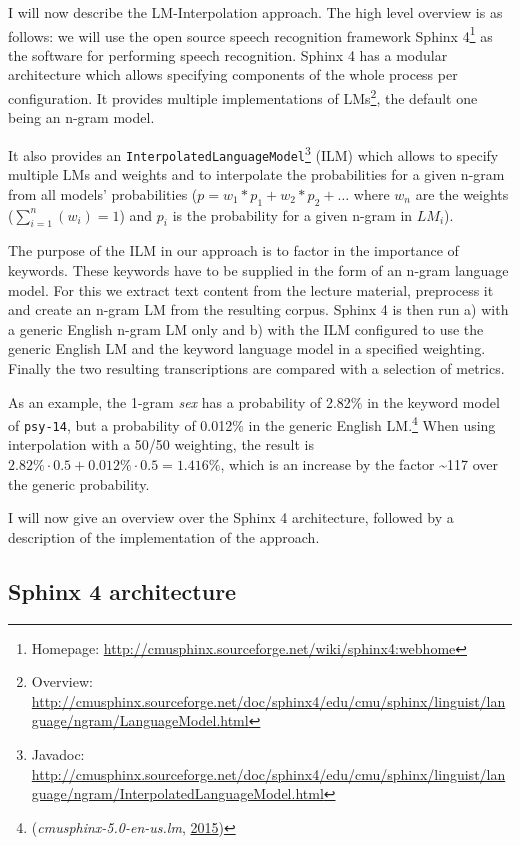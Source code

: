 \documentclass[]{article}
\begin{document}
I will now describe the LM-Interpolation approach. The high level
overview is as follows: we will use the open source speech recognition
framework Sphinx 4\footnote{Homepage:
  \url{http://cmusphinx.sourceforge.net/wiki/sphinx4:webhome}} as the
software for performing speech recognition. Sphinx 4 has a modular
architecture which allows specifying components of the whole process per
configuration. It provides multiple implementations of LMs\footnote{Overview:
  \url{http://cmusphinx.sourceforge.net/doc/sphinx4/edu/cmu/sphinx/linguist/language/ngram/LanguageModel.html}},
the default one being an n-gram model.

It also provides an \texttt{InterpolatedLanguageModel}\footnote{Javadoc:
  \url{http://cmusphinx.sourceforge.net/doc/sphinx4/edu/cmu/sphinx/linguist/language/ngram/InterpolatedLanguageModel.html}}
(ILM) which allows to specify multiple LMs and weights and to
interpolate the probabilities for a given n-gram from all models'
probabilities (\(p = w_1*p_1 + w_2*p_2 + \ldots\) where \(w_n\) are the
weights (\(\sum_{i=1}^n(w_i) = 1\)) and \(p_i\) is the probability for a
given n-gram in \(LM_i\)).

The purpose of the ILM in our approach is to factor in the importance of
keywords. These keywords have to be supplied in the form of an n-gram
language model. For this we extract text content from the lecture
material, preprocess it and create an n-gram LM from the resulting
corpus. Sphinx 4 is then run a) with a generic English n-gram LM only
and b) with the ILM configured to use the generic English LM and the
keyword language model in a specified weighting. Finally the two
resulting transcriptions are compared with a selection of metrics.

As an example, the 1-gram \emph{sex} has a probability of 2.82\% in the
keyword model of \texttt{psy-14}, but a probability of 0.012\% in the
generic English LM.\footnote{(\emph{cmusphinx-5.0-en-us.lm},
  \hyperref[ref-cmuLm]{2015})} When using interpolation with a 50/50
weighting, the result is
\(2.82\% \cdot 0.5 + 0.012\% \cdot 0.5 = 1.416\%\), which is an increase
by the factor \textasciitilde{}117 over the generic probability.

I will now give an overview over the Sphinx 4 architecture, followed by
a description of the implementation of the approach.

\subsection{Sphinx 4 architecture}\label{sphinx-4-architecture}
\end{document}

